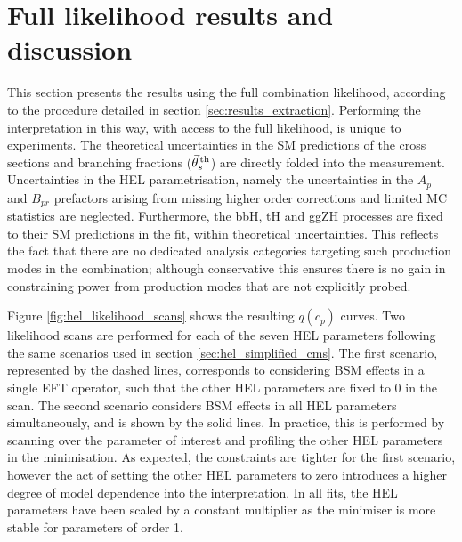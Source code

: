 \begin{figure}[htb!]
{  }
  \label{fig:hel_chi2_simplified_1}
\end{figure}

\FloatBarrier
\newpage
\section{Full likelihood results and discussion}\label{sec:eft_results}
This section presents the results using the full combination likelihood, according to the procedure detailed in section \ref{sec:results_extraction}. Performing the interpretation in this way, with access to the full likelihood, is unique to experiments.
The theoretical uncertainties in the SM predictions of the cross sections and branching fractions ($\vec{\theta}^{\,\rm{th}}_{s}$) are directly folded into the measurement. Uncertainties in the HEL parametrisation, namely the uncertainties in the $A_p$ and $B_{pr}$ prefactors arising from missing higher order corrections and limited MC statistics are neglected. Furthermore, the bbH, tH and ggZH processes are fixed to their SM predictions in the fit, within theoretical uncertainties. This reflects the fact that there are no dedicated analysis categories targeting such production modes in the combination; although conservative this ensures there is no gain in constraining power from production modes that are not explicitly probed.

Figure \ref{fig:hel_likelihood_scans} shows the resulting $q(c_p)$ curves. Two likelihood scans are performed for each of the seven HEL parameters following the same scenarios used in section \ref{sec:hel_simplified_cms}. The first scenario, represented by the dashed lines, corresponds to considering BSM effects in a single EFT operator, such that the other HEL parameters are fixed to 0 in the scan. The second scenario considers BSM effects in all HEL parameters simultaneously, and is shown by the solid lines. In practice, this is performed by scanning over the parameter of interest and profiling the other HEL parameters in the minimisation. As expected, the constraints are tighter for the first scenario, however the act of setting the other HEL parameters to zero introduces a higher degree of model dependence into the interpretation. In all fits, the HEL parameters have been scaled by a constant multiplier as the minimiser is more stable for parameters of order 1.

